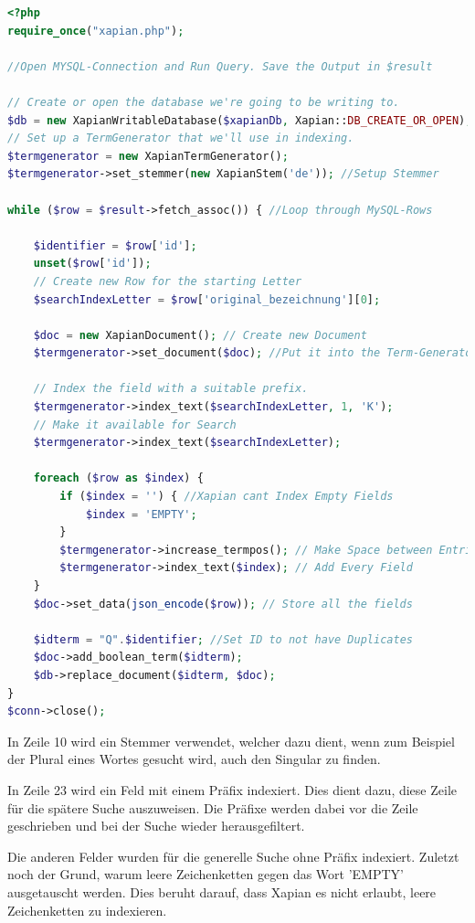 \begin{lstlisting}[language=php, frame=single, label={lst:XapPhp}, morekeywords={type,uninvertible,indexed,stored,field,multiValued, name}, caption=Skript zur Indexierung der Daten in Xapian,captionpos=b] 
<?php
require_once("xapian.php");

//Open MYSQL-Connection and Run Query. Save the Output in $result

// Create or open the database we're going to be writing to.
$db = new XapianWritableDatabase($xapianDb, Xapian::DB_CREATE_OR_OPEN);
// Set up a TermGenerator that we'll use in indexing.
$termgenerator = new XapianTermGenerator();
$termgenerator->set_stemmer(new XapianStem('de')); //Setup Stemmer

while ($row = $result->fetch_assoc()) { //Loop through MySQL-Rows

	$identifier = $row['id'];
	unset($row['id']);
	// Create new Row for the starting Letter
	$searchIndexLetter = $row['original_bezeichnung'][0];

	$doc = new XapianDocument(); // Create new Document
	$termgenerator->set_document($doc); //Put it into the Term-Generator

	// Index the field with a suitable prefix.
	$termgenerator->index_text($searchIndexLetter, 1, 'K'); 
	// Make it available for Search
	$termgenerator->index_text($searchIndexLetter); 

	foreach ($row as $index) {
		if ($index = '') { //Xapian cant Index Empty Fields
			$index = 'EMPTY';
		}
		$termgenerator->increase_termpos(); // Make Space between Entries
		$termgenerator->index_text($index); // Add Every Field
	}
	$doc->set_data(json_encode($row)); // Store all the fields

	$idterm = "Q".$identifier; //Set ID to not have Duplicates
	$doc->add_boolean_term($idterm);
	$db->replace_document($idterm, $doc);
}
$conn->close();
\end{lstlisting}

In Zeile 10 wird ein Stemmer verwendet, welcher dazu dient, wenn zum Beispiel der Plural eines Wortes gesucht wird, auch den Singular zu finden.

In Zeile 23 wird ein Feld mit einem Präfix indexiert. Dies dient dazu, diese Zeile für die spätere Suche auszuweisen. Die Präfixe werden dabei vor die Zeile geschrieben und bei der Suche wieder herausgefiltert. 

Die anderen Felder wurden für die generelle Suche ohne Präfix indexiert. Zuletzt noch der Grund, warum leere Zeichenketten gegen das Wort 'EMPTY' ausgetauscht werden. Dies beruht darauf, dass Xapian es nicht erlaubt, leere Zeichenketten zu indexieren.

